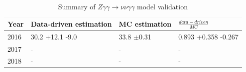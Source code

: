\begin{table}[h]
	\centering
	\caption{Summary of $Z \gamma \gamma \rightarrow \nu \nu \gamma \gamma$ model validation}
	\begin{tabular}{l|l|l|l}
		\hline
		Year & Data-driven estimation & MC estimation & $\frac{data-driven}{MC}$ \\
		\hline
		\hline
		2016 & 30.2 +12.1 -9.0 & 33.8 $\pm$0.31 & 0.893 +0.358 -0.267 \\
		\hline
		2017 & - & - & - \\
		\hline
		2018 & - & - & - \\
		\hline
	\end{tabular}
	\label{table:ZGGtonunuGG}
\end{table}
